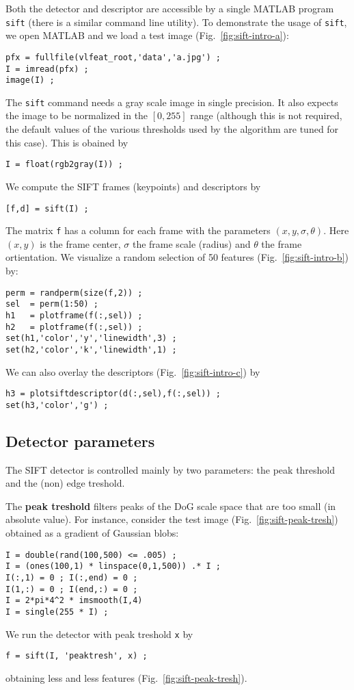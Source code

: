 \documentclass{article}
\begin{document}
Both the detector and descriptor are accessible by a single MATLAB
program \verb$sift$ (there is a similar command line utility). To
demonstrate the usage of \verb$sift$, we open MATLAB and we load a
test image (Fig.~\ref{fig:sift-intro-a}):
\begin{verbatim}
pfx = fullfile(vlfeat_root,'data','a.jpg') ;
I = imread(pfx) ;
image(I) ;
\end{verbatim}
The \verb$sift$ command needs a gray scale image in single
precision. It also expects the image to be normalized in the $[0,255]$
range (although this is not required, the default values of the
various thresholds used by the algorithm are tuned for this
case). This is obained by
\begin{verbatim}
I = float(rgb2gray(I)) ;
\end{verbatim}
We compute the SIFT frames (keypoints) and descriptors by
\begin{verbatim}
[f,d] = sift(I) ;
\end{verbatim}
The matrix \verb$f$ has a column for each frame with the parameters
$(x,y,\sigma,\theta)$. Here $(x,y)$ is the frame center, $\sigma$ the
frame scale (radius) and $\theta$ the frame ortientation. We visualize
a random selection of 50 features (Fig.~\ref{fig:sift-intro-b}) by:
\begin{verbatim}
perm = randperm(size(f,2)) ; 
sel  = perm(1:50) ;
h1   = plotframe(f(:,sel)) ; 
h2   = plotframe(f(:,sel)) ; 
set(h1,'color','y','linewidth',3) ;
set(h2,'color','k','linewidth',1) ;
\end{verbatim}
We can also overlay the descriptors (Fig.~\ref{fig:sift-intro-c}) by
\begin{verbatim}
h3 = plotsiftdescriptor(d(:,sel),f(:,sel)) ;  
set(h3,'color','g') ;
\end{verbatim}

\subsection{Detector parameters}\label{sift.parameters}

The SIFT detector is controlled mainly by two parameters: the peak
threshold and the (non) edge treshold. 

The {\bf peak treshold} filters peaks of the DoG scale space that are
too small (in absolute value). For instance, consider the test image
(Fig.~\ref{fig:sift-peak-tresh}) obtained as a gradient of Gaussian
blobs:
\begin{verbatim}
I = double(rand(100,500) <= .005) ;
I = (ones(100,1) * linspace(0,1,500)) .* I ;
I(:,1) = 0 ; I(:,end) = 0 ;
I(1,:) = 0 ; I(end,:) = 0 ;
I = 2*pi*4^2 * imsmooth(I,4)
I = single(255 * I) ;
\end{verbatim}
We run the detector with peak treshold \verb$x$ by
\begin{verbatim}
f = sift(I, 'peaktresh', x) ;
\end{verbatim}
obtaining less and less features (Fig.~\ref{fig:sift-peak-tresh}).
\end{document}
